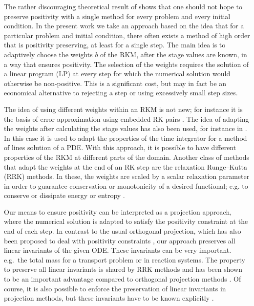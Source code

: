 \documentclass[a4paper]{article}
\numberwithin{equation}{section}
\theoremstyle{plain}
\theoremstyle{definition}
\numberwithin{theorem}{section}
\newcommand{\1}{\mathbbm{1}}
\begin{document}
The rather discouraging theoretical result of \cite{bolley_conservation_1978} shows that one
should not hope to preserve positivity with a single method for every problem and every
initial condition.  In the present work we take an approach based on the idea that for
a particular problem and initial condition, there often exists a method of high order
that is positivity preserving, at least for a single step.
The main idea is to adaptively choose the weights $b$ of the RKM, after
the stage values are known, in a way that ensures positivity.
The selection of the weights requires the solution of a linear program (LP) at every
step for which the numerical solution would otherwise be non-positive.
This is a significant cost, but may in fact be an economical alternative to rejecting
a step or using excessively small step sizes.

The idea of using different weights within an RKM is not new; for instance it is
the basis of error approximation using embedded RK pairs \cite{hairer_solving_1993}.
The idea of adapting the weights after calculating the stage values has also been used,
for instance in \cite{ketcheson_spatially_2013}.
In this case it is used to adapt the properties of the time integrator for a method of lines solution of a PDE. With this approach, it is possible to have different properties of the RKM at different parts of the domain.
Another class of methods that adapt the weights at the end of an RK step
are the relaxation Runge--Kutta (RRK) methods.
In these, the weights are scaled by a scalar relaxation parameter in order to guarantee
conservation or monotonicity of a desired functional; e.g. to conserve or
dissipate energy or entropy
\cite{ketcheson_relaxation_2019,ranocha_relaxation_2019,ranocha2020general}.

Our means to ensure positivity can be interpreted as a projection
approach, where the numerical solution is adapted to satisfy the
positivity constraint at the end of each step. In contrast to the
usual orthogonal projection, which has also been proposed to deal
with positivity constraints \cite{shampine1986conservation},
our approach preserves all linear invariants of the given ODE. These
invariants can be very important. e.g.\ the total mass for a transport
problem or in reaction systems. The property to preserve all linear
invariants is shared by RRK methods and has been shown to be an
important advantage compared to orthogonal projection methods
\cite{ranocha2020relaxationHamiltonian}. Of course, it is also
possible to enforce the preservation of linear invariants in projection
methods, but these invariants have to be known explicitly
\cite{sandu2001positive}.
\end{document}

